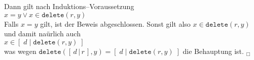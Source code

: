 \documentclass{article}
\begin{document}
\begin{enumerate}
\begin{enumerate}
            Dann gilt nach Induktions--Voraussetzung \\[0.1cm]
            \hspace*{1.3cm} $x = y \vee x \in \mathtt{delete}(r,y)$ \\[0.1cm]
            Falls $x = y$ gilt, ist der Beweis abgeschlossen.  Sonst gilt also $x \in \mathtt{delete}(r,y)$
            und damit na\"urlich auch \\[0.1cm]
            \hspace*{1.3cm} $x \in [\;d\;|\;\mathtt{delete}(r,y)\;]$ \\[0.1cm]
            was wegen  $\mathtt{delete}([\,d\,|\,r\,],y) = [\;d\;|\;\mathtt{delete}(r,y)\;]$ die Behauptung ist. 
            \hspace*{\fill} $_\Box$
      \end{enumerate}
      \hspace*{1.3cm} 
\end{enumerate}
\end{document}
